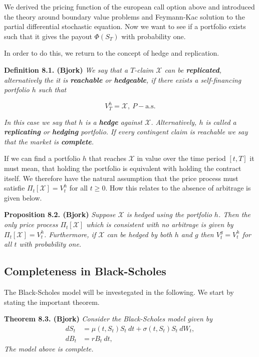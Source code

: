 \documentclass[a4paper,12pt,openany]{book}
\begin{document}
We derived the pricing function of the european call option above and introduced the theory around boundary value problems and Feymann-Kac solution to the partial differential stochastic equation. Now we want to see if a portfolio exists such that it gives the payout \(\Phi(S_T)\) with probability one.

In order to do this, we return to the concept of hedge and replication.

\textbf{Definition 8.1. (Bjork)} \emph{We say that a \(T\)-claim \(\mathcal{X}\) can be \textbf{replicated}, alternatively the it is \textbf{reachable} or \textbf{hedgeable}, if there exists a self-financing portfolio \(h\) such that}

\[
V_T^h=\mathcal{X},\ P-\text{a.s.}\tag{8.1}
\]

\emph{In this case we say that \(h\) is a \textbf{hedge} against \(\mathcal{X}\). Alternatively, \(h\) is called a \textbf{replicating} or \textbf{hedging} portfolio. If every contingent claim is reachable we say that the market is \textbf{complete}.}

If we can find a portfolio \(h\) that reaches \(\mathcal{X}\) in value over the time period \([t,T]\) it must mean, that holding the portfolio is equivalent with holding the contract itself. We therefore have the natural assumption that the price process must satisfie \(\Pi_t[\mathcal{X}]=V_t^h\) for all \(t\ge 0\). How this relates to the absence of arbitrage is given below.

\textbf{Proposition 8.2. (Bjork)} \emph{Suppose \(\mathcal{X}\) is hedged using the portfolio \(h\). Then the only price process \(\Pi_t[\mathcal{X}]\) which is consistent with no arbitrage is given by \(\Pi_t[\mathcal{X}]=V_t^h\). Furthermore, if \(\mathcal{X}\) can be hedged by both \(h\) and \(g\) then \(V_t^g=V_t^h\) for all \(t\) with probability one.}

\hypertarget{completeness-in-black-scholes}{%
\subsection{Completeness in Black-Scholes}\label{completeness-in-black-scholes}}

The Black-Scholes model will be investegated in the following. We start by stating the important theorem.

\textbf{Theorem 8.3. (Bjork)} \emph{Consider the Black-Scholes model given by}
\begin{align*}
dS_t&=\mu(t,S_t) S_t\ dt+\sigma(t,S_t) S_t\ dW_t,\tag{8.2}\\
dB_t&=r B_t\ dt,\tag{8.3}
\end{align*}
\emph{The model above is complete.}
\end{document}
